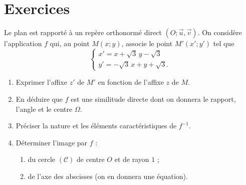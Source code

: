 
























\TCDLessonStyleOff
\clearpage
\providecommand{\Cercle}{(\mathscr{C})}
\providecommand{\CercleP}{(\mathscr{C}')}
\providecommand{\Droite}{(\mathscr{D})}
\providecommand{\DroiteP}{(\mathscr{D}')}
\providecommand{\Plan}{\mathscr{P}}
\providecommand{\mes}[2]{\mathrm{mes}\left( \widehat{ \overrightarrow{#1} , \overrightarrow{#2} } \right)}
\section{Exercices}
\begin{exo}\label{exo:sim-directe-analytique}
      Le plan est rapporté à un repère orthonormé direct $(O;\vec{u},\vec{v})$.
      On considère l'application $f$ qui, au point $M(x;y)$, associe le point $M'(x';y')$ tel que
      \[
            \left\lbrace \begin{array}{l} x' = x + \sqrt{3}\, y - \sqrt{3} \\ y' = -\sqrt{3}\, x + y + \sqrt{3} . \end{array} \right.
      \]
      \begin{enumerate}
            \item Exprimer l'affixe $z'$ de $M'$ en fonction de l'affixe $z$ de $M$.
            \item En déduire que $f$ est une similitude directe dont on donnera le rapport, l'angle et le centre $\Omega$.
            \item Préciser la nature et les éléments caractéristiques de $f^{-1}$.
            \item Déterminer l'image par $f$ :
                  \begin{enumerate}
                        \item du cercle $\Cercle$ de centre $O$ et de rayon $1$ ;
                        \item de l'axe des abscisses (on en donnera une équation).
                  \end{enumerate}
      \end{enumerate}
\end{exo}

